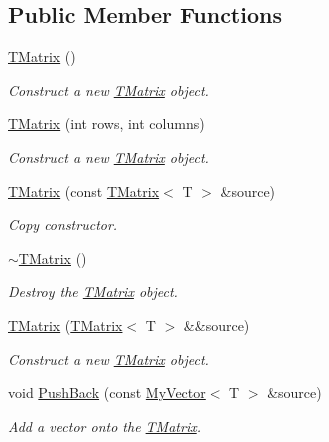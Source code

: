 \subsection*{Public Member Functions}
\begin{DoxyCompactItemize}
\item 
\mbox{\hyperlink{class_t_matrix_a50886f4101ccedbddc89973133daa625}{T\+Matrix}} ()
\begin{DoxyCompactList}\small\item\em Construct a new \mbox{\hyperlink{class_t_matrix}{T\+Matrix}} object. \end{DoxyCompactList}\item 
\mbox{\hyperlink{class_t_matrix_a183b5ca8ae02017d5879675727681ee5}{T\+Matrix}} (int rows, int columns)
\begin{DoxyCompactList}\small\item\em Construct a new \mbox{\hyperlink{class_t_matrix}{T\+Matrix}} object. \end{DoxyCompactList}\item 
\mbox{\hyperlink{class_t_matrix_a0eb2940e7ad11d4cd357541d2efbe6ce}{T\+Matrix}} (const \mbox{\hyperlink{class_t_matrix}{T\+Matrix}}$<$ T $>$ \&source)
\begin{DoxyCompactList}\small\item\em Copy constructor. \end{DoxyCompactList}\item 
\mbox{\hyperlink{class_t_matrix_a183cba14a9de95c889fb84870b11da1f}{$\sim$\+T\+Matrix}} ()
\begin{DoxyCompactList}\small\item\em Destroy the \mbox{\hyperlink{class_t_matrix}{T\+Matrix}} object. \end{DoxyCompactList}\item 
\mbox{\hyperlink{class_t_matrix_ac76352f76eb4ebba385010c2779b6793}{T\+Matrix}} (\mbox{\hyperlink{class_t_matrix}{T\+Matrix}}$<$ T $>$ \&\&source)
\begin{DoxyCompactList}\small\item\em Construct a new \mbox{\hyperlink{class_t_matrix}{T\+Matrix}} object. \end{DoxyCompactList}\item 
void \mbox{\hyperlink{class_t_matrix_a24e6b8326823cba70691cfb92d73fc95}{Push\+Back}} (const \mbox{\hyperlink{class_my_vector}{My\+Vector}}$<$ T $>$ \&source)
\begin{DoxyCompactList}\small\item\em Add a vector onto the \mbox{\hyperlink{class_t_matrix}{T\+Matrix}}. \end{DoxyCompactList}\item 

\end{DoxyCompactItemize}
